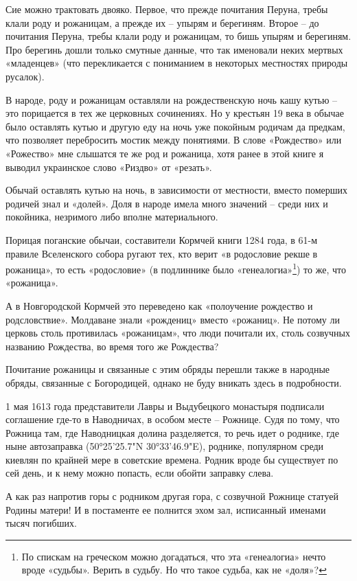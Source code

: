 Сие можно трактовать двояко. Первое, что прежде почитания Перуна, требы клали роду и рожаницам, а прежде их – упырям и берегиням. Второе – до почитания Перуна, требы клали роду и рожаницам, то бишь упырям и берегиням. Про берегинь дошли только смутные данные, что так именовали неких мертвых «младенцев» (что перекликается с пониманием в некоторых местностях природы русалок).

В народе, роду и рожаницам оставляли на рождественскую ночь кашу кутью – это порицается в тех же церковных сочинениях. Но у крестьян 19 века в обычае было оставлять кутью и другую еду на ночь уже покойным родичам да предкам, что позволяет перебросить мостик между понятиями. В слове «Рождество» или «Рожество» мне слышатся те же род и рожаница, хотя ранее в этой книге я выводил украинское слово «Риздво» от «резать».%

Обычай оставлять кутью на ночь, в зависимости от местности, вместо померших родичей знал и «долей». Доля в народе имела много значений – среди них и покойника, незримого либо вполне материального.

Порицая поганские обычаи, составители Кормчей книги 1284 года, в 61-м правиле Вселенского собора ругают тех, кто верит «в родословие рекше в рожаница», то есть «родословие» (в подлиннике было «генеалогиа»\footnote{По спискам на греческом можно догадаться, что эта «генеалогиа» нечто вроде «судьбы». Верить в судьбу. Но что такое судьба, как не «доля»?}) то же, что «рожаница».

А в Новгородской Кормчей это переведено как «полоучение рождество и родсловствие». Молдаване знали «рождениц» вместо «рожаниц». Не потому ли церковь столь противилась «рожаницам», что люди почитали их, столь созвучных названию Рождества, во время того же Рождества?

Почитание рожаницы и связанные с этим обряды перешли также в народные обряды, связанные с Богородицей, однако не буду вникать здесь в подробности.

1 мая 1613 года представители Лавры и Выдубецкого монастыря подписали соглашение где-то в Наводничах, в особом месте – Рожнице. Судя по тому, что Рожница там, где Наводницкая долина разделяется, то речь идет о роднике, где ныне автозаправка (50°25'25.7"N 30°33'46.9"E), роднике, популярном среди киевлян по крайней мере в советские времена. Родник вроде бы существует по сей день, и к нему можно попасть, если обойти заправку слева.

А как раз напротив горы с родником другая гора, с созвучной Рожнице статуей Родины матери! И в постаменте ее полнится эхом зал, исписанный именами тысяч погибших.

